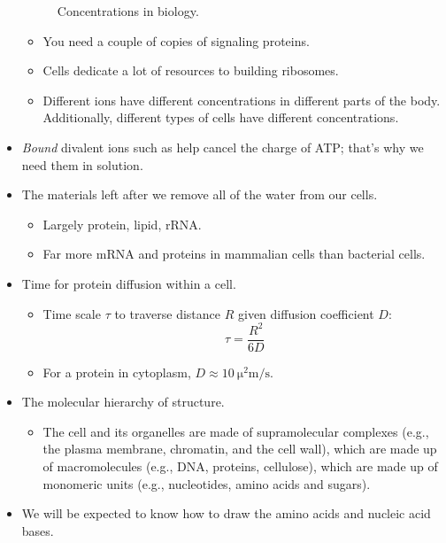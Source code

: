 \documentclass[../notes.tex]{subfiles}
\begin{document}
\begin{itemize}
\begin{figure}[h!]
        \caption{Concentrations in biology.}
        \label{fig:bioConcentrations}
    \end{figure}
    \begin{itemize}
        \item You need a couple of copies of signaling proteins.
        \item Cells dedicate a lot of resources to building ribosomes.
        \item Different ions have different concentrations in different parts of the body. Additionally, different types of cells have different concentrations.
    \end{itemize}
    \item \emph{Bound} divalent ions such as  help cancel the charge of ATP; that's why we need them in solution.
    \item The materials left after we remove all of the water from our cells.
    \begin{itemize}
        \item Largely protein, lipid, rRNA.
        \item Far more mRNA and proteins in mammalian cells than bacterial cells.
    \end{itemize}
    \item Time for protein diffusion within a cell.
    \begin{itemize}
        \item Time scale $\tau$ to traverse distance $R$ given diffusion coefficient $D$:
        \begin{equation*}
            \tau = \frac{R^2}{6D}
        \end{equation*}
        \item For a protein in cytoplasm, $D\approx\SI[per-mode=symbol]{10}{\square\micro\meter\per\second}$.
    \end{itemize}
    \item The molecular hierarchy of structure.
    \begin{itemize}
        \item The cell and its organelles are made of supramolecular complexes (e.g., the plasma membrane, chromatin, and the cell wall), which are made up of macromolecules (e.g., DNA, proteins, cellulose), which are made up of monomeric units (e.g., nucleotides, amino acids and sugars).
    \end{itemize}
    \item We will be expected to know how to draw the amino acids and nucleic acid bases.

\end{itemize}
\end{document}
